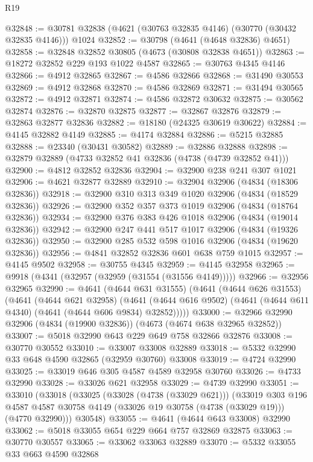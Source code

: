 \begin{lexlean}{R19}
\begin{coremodule}
@32848 := @30781 @32838 (@4621 (@30763 @32835 @4146) (@30770 (@30432 @32835 @4146))) @1024
@32852 := @30798 (@4641 (@4648 @32836) @4651)
@32858 := @32848 @32852 @30805 (@4673 (@30808 @32838 @4651))
@32863 := @18272 @32852 @229 @193 @1022 @4587
@32865 := @30763 @4345 @4146
@32866 := @4912 @32865
@32867 := @4586 @32866
@32868 := @31490 @30553
@32869 := @4912 @32868
@32870 := @4586 @32869
@32871 := @31494 @30565
@32872 := @4912 @32871
@32874 := @4586 @32872 @30632
@32875 := @30562 @32874
@32876 := @32870 @32875
@32877 := @32867 @32876
@32879 := @32863 @32877 @32836
@32882 := @18180 (@24325 @30619 @30622)
@32884 := @4145 @32882 @4149
@32885 := @4174 @32884
@32886 := @5215 @32885
@32888 := @23340 (@30431 @30582)
@32889 := @32886 @32888
@32898 := @32879 @32889 (@4733 @32852 @41 @32836 (@4738 (@4739 @32852 @41)))
@32900 := @4812 @32852 @32836
@32904 := @32900 @238 @241 @307 @1021
@32906 := @4621 @32877 @32889
@32910 := @32904 @32906 (@4834 (@18306 @32836))
@32918 := @32900 @310 @313 @349 @1020 @32906 (@4834 (@18529 @32836))
@32926 := @32900 @352 @357 @373 @1019 @32906 (@4834 (@18764 @32836))
@32934 := @32900 @376 @383 @426 @1018 @32906 (@4834 (@19014 @32836))
@32942 := @32900 @247 @441 @517 @1017 @32906 (@4834 (@19326 @32836))
@32950 := @32900 @285 @532 @598 @1016 @32906 (@4834 (@19620 @32836))
@32956 := @4841 @32852 @32836 @601 @638 @759 @1015
@32957 := @4145 @9502
@32958 := @30755 @4345
@32959 := @4145 @32958
@32965 := @9918 (@4341 (@32957 (@32959 (@31554 (@31556 @4149)))))
@32966 := @32956 @32965
@32990 := @4641
    (@4644 @631 @31555)
    (@4641
      (@4644 @626 @31553)
      (@4641
        (@4644 @621 @32958)
        (@4641 (@4644 @616 @9502) (@4641 (@4644 @611 @4340) (@4641 (@4644 @606 @9834) @32852)))))
@33000 := @32966 @32990 @32906 (@4834 (@19900 @32836)) (@4673 (@4674 @638 @32965 @32852))
@33007 := @5018 @32990 @643 @229 @649 @758 @32866 @32876
@33008 := @30770 @30552
@33010 := @33007 @33008 @32889
@33018 := @5332 @32990 @33 @648 @4590 @32865 (@32959 @30760) @33008
@33019 := @4724 @32990
@33025 := @33019 @646 @305 @4587 @4589 @32958 @30760
@33026 := @4733 @32990
@33028 := @33026 @621 @32958
@33029 := @4739 @32990
@33051 := @33010
    (@33018
      (@33025
        (@33028 (@4738 (@33029 @621)))
        (@33019
          @303
          @196
          @4587
          @4587
          @30758
          @4149
          (@33026 @19 @30758 (@4738 (@33029 @19)))
          (@4770 @32990)))
      @30548)
@33055 := @4641 (@4644 @643 @33008) @32990
@33062 := @5018 @33055 @654 @229 @664 @757 @32869 @32875
@33063 := @30770 @30557
@33065 := @33062 @33063 @32889
@33070 := @5332 @33055 @33 @663 @4590 @32868

\end{coremodule}
\end{lexlean}
